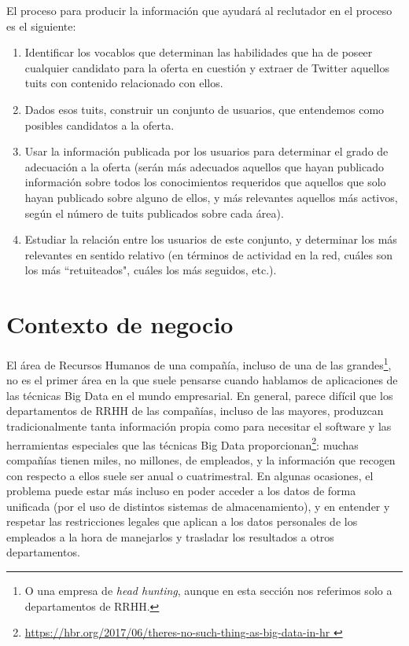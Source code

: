 El proceso para producir la información que ayudará al reclutador en el proceso es el siguiente:
\begin{enumerate}
\item Identificar los vocablos que determinan las habilidades que ha de poseer cualquier candidato
para la oferta en cuestión y extraer de Twitter aquellos tuits con contenido relacionado con ellos.
\item Dados esos tuits, construir un conjunto de usuarios, que entendemos como posibles candidatos 
a la oferta.
\item Usar la información publicada por los usuarios para determinar el grado de adecuación a la oferta
(serán más adecuados aquellos que hayan publicado información sobre todos los conocimientos requeridos que 
aquellos que solo hayan publicado sobre alguno de ellos, y más relevantes aquellos más activos, según el
número de tuits publicados sobre cada área).
\item Estudiar la relación entre los usuarios de este conjunto, y determinar los más relevantes en sentido
relativo (en términos de actividad en la red, cuáles son los más ``retuiteados", cuáles los más seguidos, etc.).
\end{enumerate}



\section{Contexto de negocio}
El área de Recursos Humanos de una compañía, incluso de una de las grandes\footnote{O
una empresa de {\em head hunting}, aunque en esta sección nos referimos solo a departamentos
de RRHH.}, no es el primer área 
en la que suele pensarse cuando hablamos de aplicaciones de las técnicas Big Data en el mundo
empresarial. En general,
parece difícil que los departamentos de RRHH de las compañías,  incluso de las mayores, produzcan
tradicionalmente tanta información propia como para necesitar el software y las herramientas especiales
que las técnicas Big Data proporcionan\footnote{\url{https://hbr.org/2017/06/theres-no-such-thing-as-big-data-in-hr }}:
muchas compañías tienen miles, no millones, de empleados, y la información que recogen con respecto a ellos suele ser anual o cuatrimestral. En algunas ocasiones, el problema puede estar más incluso en
poder acceder a los datos de forma unificada (por el uso de distintos sistemas de almacenamiento),
y en entender y respetar las restricciones legales que aplican a los datos personales de los empleados
a la hora de manejarlos y trasladar los resultados a otros departamentos.

